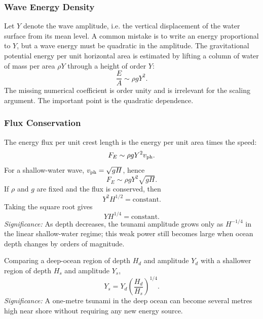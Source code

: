 \subsubsection*{Wave Energy Density}
Let $Y$ denote the wave amplitude, i.e. the vertical displacement of the water
surface from its mean level. A common mistake is to write an energy proportional
to $Y$, but a wave energy must be quadratic in the amplitude. The gravitational
potential energy per unit horizontal area is estimated by lifting a column of
water of mass per area $\rho Y$ through a height of order $Y$:
\begin{equation}
    \frac{E}{A}\sim \rho gY^2 .
    \label{eq:lec11:water-energy-area}
\end{equation}
The missing numerical coefficient is order unity and is irrelevant for the
scaling argument. The important point is the quadratic dependence.

\subsubsection*{Flux Conservation}
The energy flux per unit crest length is the energy per unit area times the
speed:
\begin{equation}
    F_E \sim \rho gY^2 v_{\rm ph}.
    \label{eq:lec11:energy-flux}
\end{equation}
For a shallow-water wave, $v_{\rm ph}=\sqrt{gH}$, hence
\begin{equation}
    F_E \sim \rho gY^2\sqrt{gH}.
    \label{eq:lec11:energy-flux-shallow}
\end{equation}
If $\rho$ and $g$ are fixed and the flux is conserved, then
\begin{equation}
    Y^2H^{1/2}=\text{constant}.
    \label{eq:lec11:y2hhalf}
\end{equation}
Taking the square root gives
\begin{equation}
    \boxed{
    YH^{1/4}=\text{constant}.
    }
    \label{eq:lec11:green-law}
\end{equation}
\textit{Significance:} As depth decreases, the tsunami amplitude grows only as
$H^{-1/4}$ in the linear shallow-water regime; this weak power still becomes
large when ocean depth changes by orders of magnitude.

Comparing a deep-ocean region of depth $H_d$ and amplitude $Y_d$ with a shallower
region of depth $H_s$ and amplitude $Y_s$,
\begin{equation}
    \boxed{
    Y_s=Y_d\left(\frac{H_d}{H_s}\right)^{1/4}.
    }
    \label{eq:lec11:shoaling-ratio}
\end{equation}
\textit{Significance:} A one-metre tsunami in the deep ocean can become several
metres high near shore without requiring any new energy source.

